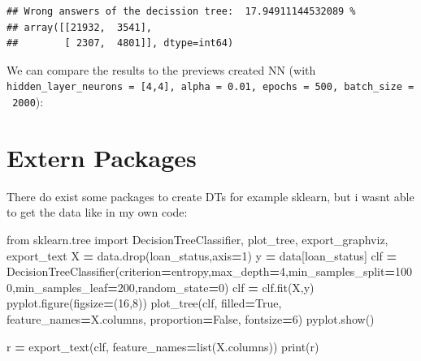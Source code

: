 \documentclass[
]{book}
\newenvironment{Shaded}{\begin{snugshade}}{\end{snugshade}}
\newcommand{\BuiltInTok}[1]{#1}
\newcommand{\DecValTok}[1]{\textcolor[rgb]{0.00,0.00,0.81}{#1}}
\newcommand{\ImportTok}[1]{#1}
\newcommand{\NormalTok}[1]{#1}
\newcommand{\OperatorTok}[1]{\textcolor[rgb]{0.81,0.36,0.00}{\textbf{#1}}}
\newcommand{\StringTok}[1]{\textcolor[rgb]{0.31,0.60,0.02}{#1}}
\newcommand{\VariableTok}[1]{\textcolor[rgb]{0.00,0.00,0.00}{#1}}
\begin{document}
\begin{verbatim}
## Wrong answers of the decission tree:  17.94911144532089 %
## array([[21932,  3541],
##        [ 2307,  4801]], dtype=int64)
\end{verbatim}

We can compare the results to the previews created NN (with \texttt{hidden\_layer\_neurons\ =\ {[}4,4{]},\ alpha\ =\ 0.01,\ epochs\ =\ 500,\ batch\_size\ =\ 2000}):

\hypertarget{extern-packages}{%
\section{Extern Packages}\label{extern-packages}}

There do exist some packages to create DTs for example sklearn, but i wasnt able to get the data like in my own code:

\begin{Shaded}
\begin{Highlighting}[]
\ImportTok{from}\NormalTok{ sklearn.tree }\ImportTok{import}\NormalTok{ DecisionTreeClassifier, plot\_tree, export\_graphviz, export\_text}
\NormalTok{X }\OperatorTok{=}\NormalTok{ data.drop(}\StringTok{\textquotesingle{}loan\_status\textquotesingle{}}\NormalTok{,axis}\OperatorTok{=}\DecValTok{1}\NormalTok{)}
\NormalTok{y }\OperatorTok{=}\NormalTok{ data[}\StringTok{\textquotesingle{}loan\_status\textquotesingle{}}\NormalTok{]}
\NormalTok{clf }\OperatorTok{=}\NormalTok{ DecisionTreeClassifier(criterion}\OperatorTok{=}\StringTok{\textquotesingle{}entropy\textquotesingle{}}\NormalTok{,max\_depth}\OperatorTok{=}\DecValTok{4}\NormalTok{,min\_samples\_split}\OperatorTok{=}\DecValTok{1000}\NormalTok{,min\_samples\_leaf}\OperatorTok{=}\DecValTok{200}\NormalTok{,random\_state}\OperatorTok{=}\DecValTok{0}\NormalTok{)}
\NormalTok{clf }\OperatorTok{=}\NormalTok{ clf.fit(X,y)}
\NormalTok{pyplot.figure(figsize}\OperatorTok{=}\NormalTok{(}\DecValTok{16}\NormalTok{,}\DecValTok{8}\NormalTok{))}
\NormalTok{plot\_tree(clf, filled}\OperatorTok{=}\VariableTok{True}\NormalTok{, feature\_names}\OperatorTok{=}\NormalTok{X.columns, proportion}\OperatorTok{=}\VariableTok{False}\NormalTok{, fontsize}\OperatorTok{=}\DecValTok{6}\NormalTok{)}
\NormalTok{pyplot.show()}

\NormalTok{r }\OperatorTok{=}\NormalTok{ export\_text(clf, feature\_names}\OperatorTok{=}\BuiltInTok{list}\NormalTok{(X.columns))}
\BuiltInTok{print}\NormalTok{(r)}
\end{Highlighting}
\end{Shaded}
\end{document}
